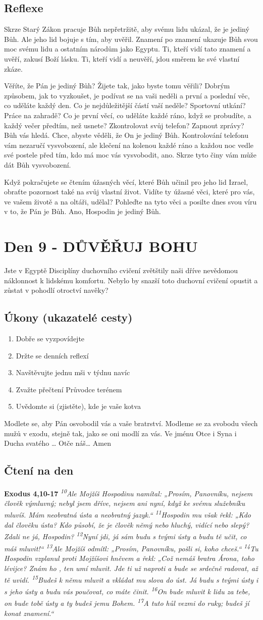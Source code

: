 \documentclass[11pt]{article}
\newcommand{\zacatekDruhyTyden}{
  Jste v Egyptě \newline
  Disciplíny duchovního cvičení zvětštily naši dříve nevědomou náklonnost k lidskému komfortu.
  Nebylo by snazší toto duchovní cvičení opustit a zůstat v pohodlí otroctví navěky?

  \subsection*{Úkony (ukazatelé cesty)}
\begin{enumerate}
  \item Dobře se vyzpovídejte
  \item Držte se denních reflexí
  \item Navštěvujte jednu mši v týdnu navíc
  \item Zvažte přečtení Průvodce terénem
  \item Uvědomte si (zjistěte), kde je vaše kotva
\end{enumerate}
Modlete se, aby Pán osvobodil vás a vaše bratrství. \newline
Modleme se za svobodu všech mužů v exodu, stejně tak, jako se oni modlí za vás.\newline
Ve jménu Otce i Syna i Ducha svatého …  Otče náš… Amen
}
\begin{document}
\subsection*{Reflexe}
Skrze Starý Zákon pracuje Bůh nepřetržitě, aby svému lidu ukázal, že je jediný Bůh. Ale jeho lid bojuje
s tím, aby uvěřil. Znamení po znamení ukazuje Bůh svou moc svému lidu a ostatním národům jako Egyptu.
Ti, kteří vidí tato znamení a uvěří, zakusí Boží lásku. Ti, kteří vidí a neuvěří, jdou směrem ke své vlastní
zkáze.

Věříte, že Pán je jediný Bůh? Žijete tak, jako byste tomu věřili? Dobrým způsobem, jak to vyzkoušet, je
podívat se na vaši neděli a první a poslední věc, co uděláte každý den. Co je nejdůležitější částí vaší neděle?
Sportovní utkání? Práce na zahradě? Co je první věcí, co uděláte každé ráno, když se probudíte, a každý
večer předtím, než usnete? Zkontrolovat svůj telefon? Zapnout zprávy? Bůh vás hledá. Chce, abyste věděli,
že On je jediný Bůh. Kontrolování telefonu vám nezaručí vysvobození, ale klečení na kolenou každé ráno
a každou noc vedle své postele před tím, kdo má moc vás vysvobodit, ano. Skrze tyto činy vám může dát
Bůh vysvobození.

Když pokračujete se čtením úžasných věcí, které Bůh učinil pro jeho lid Izrael, obraťte pozornost také na
svůj vlastní život. Vidíte ty úžasné věci, které pro vás, ve vašem životě a na oltáři, udělal? Pohleďte na tyto
věci a posilte dnes svou víru v to, že Pán je Bůh. Ano, Hospodin je jediný Bůh.


\newpage
\section{Den 9 - DŮVĚŘUJ BOHU}
\zacatekDruhyTyden
\subsection*{Čtení na den}
\textbf{Exodus 4,10-17}
\newline
\textit{
\textsuperscript{10}Ale Mojžíš Hospodinu namítal: „Prosím, Panovníku, nejsem člověk výmluvný; nebyl jsem dříve, nejsem ani nyní, když ke svému služebníku mluvíš. Mám neobratná ústa a neobratný jazyk.“
\textsuperscript{11}Hospodin mu však řekl: „Kdo dal člověku ústa? Kdo působí, že je člověk němý nebo hluchý, vidící nebo slepý? Zdali ne já, Hospodin?
\textsuperscript{12}Nyní jdi, já sám budu s tvými ústy a budu tě učit, co máš mluvit!“
\textsuperscript{13}Ale Mojžíš odmítl: „Prosím, Panovníku, pošli si, koho chceš.“
\textsuperscript{14}Tu Hospodin vzplanul proti Mojžíšovi hněvem a řekl: „Což nemáš bratra Árona, toho lévijce? Znám ho , ten umí mluvit. Jde ti už naproti a bude se srdečně radovat, až tě uvidí.
\textsuperscript{15}Budeš k němu mluvit a vkládat mu slova do úst. Já budu s tvými ústy i s jeho ústy a budu vás poučovat, co máte činit.
\textsuperscript{16}On bude mluvit k lidu za tebe, on bude tobě ústy a ty budeš jemu Bohem.
\textsuperscript{17}A tuto hůl vezmi do ruky; budeš jí konat znamení.“
}
\end{document}
